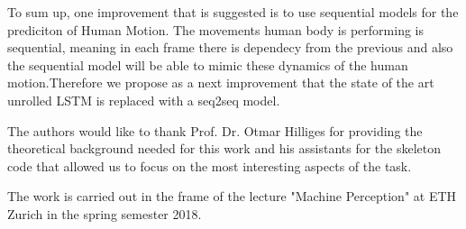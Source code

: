 To sum up, one improvement that is suggested is to use sequential models for the prediciton of Human Motion. The movements human body is performing is sequential, meaning in each frame there is dependecy from the previous and also the sequential model will be able to mimic these dynamics of the human motion.Therefore we propose as a next improvement that the state of the art unrolled LSTM is replaced with a seq2seq model. 
\begin{acks}
	The authors would like to thank Prof. Dr. Otmar Hilliges for providing the theoretical background needed for this work and his assistants for the skeleton code that allowed us to focus on the most interesting aspects of the task.
	
	The work is carried out in the frame of the lecture "Machine Perception" at ETH Zurich in the spring semester 2018.
	
\end{acks}




